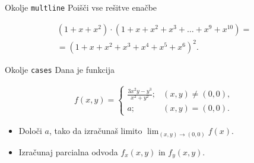 \begin{frame}{Okolje \texttt{multline}}
	Poišči vse rešitve enačbe
	
	\begin{align*}
		(1+x+x^2) \cdot (1+x+x^2+x^3+\ldots+x^9+x^{10}) =   \\
	=(1+x+x^2+x^3+x^4+x^5+x^6)^2.
	\end{align*}
	
\end{frame}

\begin{frame}{Okolje \texttt{cases}}
	Dana je funkcija
	
		\begin{align*}
			f(x,y) = \begin{cases}
				\frac{3x^2y-y^3}{x^2+y^2}; & (x,y)\neq(0,0), \\
				a; & (x,y)=(0,0).
			 \end{cases}
		\end{align*}
		
	\begin{itemize}
	\item Določi $a$, tako da izračunaš limito \( \displaystyle{\lim_{(x,y)\to(0,0)}} f(x). \)
	\item Izračunaj parcialna odvoda $f_x(x,y)$ in $f_y(x,y)$.
	\end{itemize}
\end{frame}
